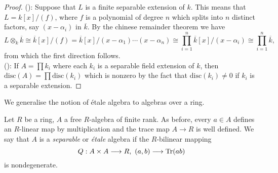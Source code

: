 \begin{proof}
	():
	Suppose that $L$ is a finite separable extension of $k$. This means that $L = k[x]/(f)$, where $f$ is a polynomial of degree $n$ which splits into $n$ distinct factors, say $(x-\alpha_i)$ in $\overline{k}$. By the chinese remainder theorem we have
	\[L \otimes_k \overline{k} \cong \overline{k}[x]/(f) = \overline{k}[x]/(x-\alpha_1)\cdots(x-\alpha_n) \cong \prod_{i=1}^n \overline{k}[x] / (x-\alpha_i) \cong \prod_{i=1}^n \overline{k},\] from which the first direction follows.\\
	():
	If $A = \prod k_i$  where each $k_i$ is a separable field extension of $k$, then $\text{disc}(A) = \prod \text{disc}(k_i)$ which is nonzero by the fact that $\text{disc}(k_i) \neq 0$ if $k_i$ is a separable extension.
\end{proof}

We generalise the notion of \'etale algebra to algebras over a ring.

\begin{definition}
	Let $R$ be a ring, $A$ a free $R$-algebra of finite rank. As before, every $a \in A$ defines an $R$-linear map by multiplication and the trace map $A \to R$ is well defined. We say that $A$ is a \textit{separable} or \textit{\'etale} algebra if the $R$-bilinear mapping
	\[
		Q : A \times A \longrightarrow R,\ (a,b) \longrightarrow \operatorname{Tr}(ab)
	\]
	is nondegenerate.
\end{definition}
